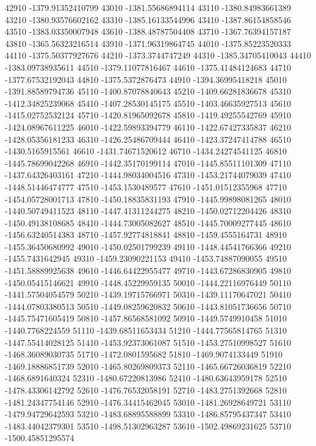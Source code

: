 {42910 -1379.91352410799
43010 -1381.55686894114
43110 -1380.84983661389
43210 -1380.93576602162
43310 -1385.16133544996
43410 -1387.86154858546
43510 -1383.03350007948
43610 -1388.48787504408
43710 -1367.76394157187
43810 -1365.56323216514
43910 -1371.96319864745
44010 -1375.85223520333
44110 -1375.50377927676
44210 -1373.3744747249
44310 -1385.34705410043
44410 -1383.09738935611
44510 -1379.11077816467
44610 -1375.41484124683
44710 -1377.67532192043
44810 -1375.5372876473
44910 -1394.36995418218
45010 -1391.88589794736
45110 -1400.87078840643
45210 -1409.66281836678
45310 -1412.34825239068
45410 -1407.28530145175
45510 -1403.46635927513
45610 -1415.02752532124
45710 -1420.81965092678
45810 -1419.49255542769
45910 -1424.08967611225
46010 -1422.59893394779
46110 -1422.67427335837
46210 -1428.05356181233
46310 -1426.25486709444
46410 -1423.37247414788
46510 -1430.5165915561
46610 -1431.74671520612
46710 -1434.24274541125
46810 -1445.78699042268
46910 -1442.35170199114
47010 -1445.85511101309
47110 -1437.64326403161
47210 -1444.98034004516
47310 -1453.21744079039
47410 -1448.51446474777
47510 -1453.1530489577
47610 -1451.01512355968
47710 -1454.05728001713
47810 -1450.18835831193
47910 -1445.99898081265
48010 -1440.50749411523
48110 -1447.41311244275
48210 -1450.02712204426
48310 -1450.49138108685
48410 -1444.73005082627
48510 -1445.70009277445
48610 -1456.63240514383
48710 -1457.92774818841
48810 -1459.4555164731
48910 -1455.36450680992
49010 -1450.02501799239
49110 -1448.44541766366
49210 -1455.7431642945
49310 -1459.23090221153
49410 -1453.74887090055
49510 -1451.58889925638
49610 -1446.64422955477
49710 -1443.67286830905
49810 -1450.05415146621
49910 -1448.45229959135
50010 -1444.22116976449
50110 -1441.57504054579
50210 -1439.19715766971
50310 -1439.11170647021
50410 -1444.07803380513
50510 -1449.08259620832
50610 -1443.81051736656
50710 -1445.75471605419
50810 -1457.86568581092
50910 -1449.5749910458
51010 -1440.7768224559
51110 -1439.68511653434
51210 -1444.77565814765
51310 -1447.55414028125
51410 -1453.92373061087
51510 -1453.27510998527
51610 -1468.36089030735
51710 -1472.0801595682
51810 -1469.9074133449
51910 -1469.18886851739
52010 -1465.80269809373
52110 -1465.66726036819
52210 -1468.6891640324
52310 -1480.67220813986
52410 -1480.63643959178
52510 -1478.43306142792
52610 -1476.76532058191
52710 -1483.2751392668
52810 -1481.24347754146
52910 -1476.34415462045
53010 -1481.26928649721
53110 -1479.94729642593
53210 -1483.68895588899
53310 -1486.85795437347
53410 -1483.44042379301
53510 -1498.51302963287
53610 -1502.49869231625
53710 -1500.45851295574
}
